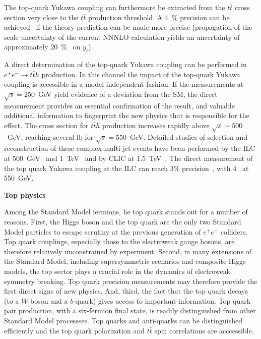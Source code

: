 The top-quark Yukawa coupling can furthermore be extracted from the $t\bar{t}$
cross section very close to the $t\bar{t}$ production threshold. A 4~\% precision can be achieved~\cite{Horiguchi:2013wra}
if the theory prediction can be made more precise (propagation of the scale uncertainty of the current NNNLO calculation yields
an uncertainty of approximately 20~\%~\cite{Vos:2016til} on $y_t$).

A direct determination of the top-quark Yukawa coupling can be performed in $e^+e^- \rightarrow t\bar{t}h$ production.
In this channel the impact of the top-quark Yukawa coupling is accessible in a model-independent fashion. If the
measurements at $\sqrt{s}=250$~GeV yield evidence of a deviation from the SM, the direct measurement provides
an essential confirmation of the result, and valuable additional information to fingerprint the new physics that
is responsible for the effect. The cross section for $t\bar{t}h$ production increases rapidly above $\sqrt{s} \sim 500 $~GeV,
reaching several fb for $\sqrt{s} = 550$~GeV. Detailed studies of selection and reconstruction of these complex multi-jet events
have been performed by the ILC at 500~GeV~\cite{Yonamine:2011jg} and 1~TeV~\cite{Price:2014oca} and by CLIC
at 1.5~TeV~\cite{Abramowicz:2018rjq}. The direct measurement of the top quark Yukawa coupling at the ILC can reach 3\%
precision~\cite{Fujii:2015jha}, with 4~\iab{} at 550~GeV.




{\bf Top physics}

Among the Standard Model fermions, he top quark stands out for a number of reasons. First, the Higgs boson
and the top quark are the only two Standard Model particles to escape scrutiny at the previous generation
of $e^+e^-$ colliders. Top quark couplings, especially those to the electroweak gauge bosons, are therefore
relatively unconstrained by experiment. Second, in many extensions of the Standard Model, including
supersymmetric scenarios and composite Higgs models, the top sector plays a crucial role in the dynamics
of electroweak symmetry breaking. Top quark precision measurements may therefore provide the first direct signs of new physics.
And, third, the fact that the top quark decays (to a $W$-boson and a $b$-quark) gives access to important information. Top quark
pair production, with a six-fermion final state, is readily distinguished from other Standard Model processses. Top quarks
and anti-quarks can be distinguished efficiently and the top quark polarization and $t\bar{t}$ spin correlations are acccessible. 

